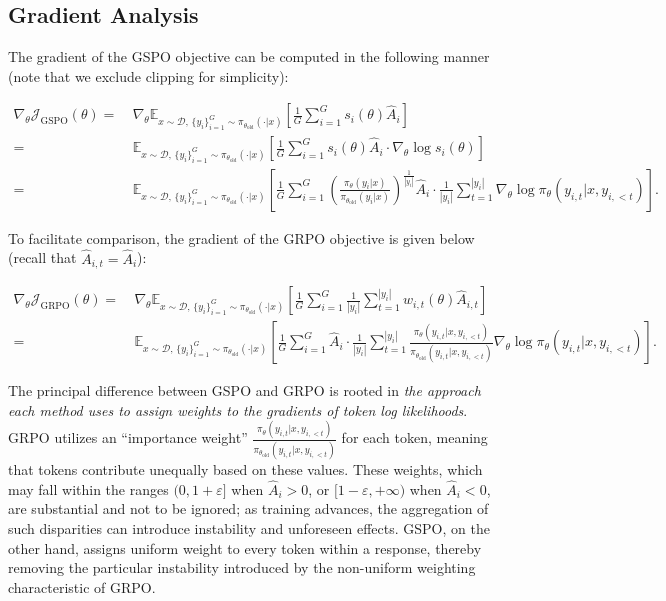 \subsection{Gradient Analysis}
\label{subsec:gradient}

The gradient of the GSPO objective can be computed in the following manner (note that we exclude clipping for simplicity):

\begin{align}
\nabla_{\theta} \mathcal{J}_\text{GSPO} (\theta)
=&\ 
\nabla_{\theta} \mathbb{E}_{ x \sim \mathcal{D},\, \{y_i\}_{i=1}^G \sim \pi_{\theta_\text{old}}( \cdot | x) }
\left[ 
\frac{1}{G} \sum_{i=1}^{G} s_{i}(\theta) \widehat{A}_{i}
\right] \\
= &\ 
\mathbb{E}_{ x \sim \mathcal{D},\, \{y_i\}_{i=1}^G \sim \pi_{\theta_\text{old}}( \cdot | x) }
\left[ 
\frac{1}{G} \sum_{i=1}^{G}
s_{i}(\theta) \widehat{A}_{i}
\cdot \nabla_{\theta} \log s_{i}(\theta)
\right] \\
=&\ 
\mathbb{E}_{ x \sim \mathcal{D},\, \{y_i\}_{i=1}^G \sim \pi_{\theta_\text{old}}( \cdot | x) }
\left[ 
\frac{1}{G} \sum_{i=1}^{G} 
\left( \frac{ \pi_{\theta} (y_i | x) }{ \pi_{\theta_\text{old}} (y_i | x)} \right)^{\frac{1}{|y_i|}} \widehat{A}_{i} 
\cdot \frac{1}{|y_i|} \sum_{t=1}^{|y_i|} \nabla_{\theta} \log \pi_{\theta} (y_{i,t} | x, y_{i,<t}) 
\right].
\label{equ:gspo_grad}
\end{align}

To facilitate comparison, the gradient of the GRPO objective is given below (recall that $\widehat{A}_{i,t} = \widehat{A}_{i}$):

\begin{align}
\nabla_{\theta} \mathcal{J}_\text{GRPO} (\theta) 
=&\ 
\nabla_{\theta} \mathbb{E}_{ x \sim \mathcal{D},\, \{y_i\}_{i=1}^G \sim \pi_{\theta_\text{old}}( \cdot | x) }
\left[ \frac{1}{G} \sum_{i=1}^{G} \frac{1}{|y_i|} \sum_{t=1}^{|y_i|} 
w_{i,t}(\theta) \widehat{A}_{i,t}
\right] \\
=&\
\mathbb{E}_{ x \sim \mathcal{D},\, \{y_i\}_{i=1}^G \sim \pi_{\theta_\text{old}}( \cdot | x) }
\left[ \frac{1}{G} \sum_{i=1}^{G} \widehat{A}_{i} 
\cdot \frac{1}{|y_i|} \sum_{t=1}^{|y_i|} 
\frac{ \pi_{\theta} (y_{i,t} | x, y_{i,<t}) }{ \pi_{\theta_\text{old}} (y_{i,t} | x,y_{i,<t})} 
\nabla_{\theta} \log \pi_{\theta} (y_{i,t} | x, y_{i,<t})  
\right].
\end{align}

The principal difference between GSPO and GRPO is rooted in \textit{the approach each method uses to assign weights to the gradients of token log likelihoods}. GRPO utilizes an ``importance weight'' $\frac{ \pi_{\theta} (y_{i,t} | x, y_{i,<t}) }{ \pi_{\theta_\text{old}} (y_{i,t} | x,y_{i,<t})}$ for each token, meaning that tokens contribute unequally based on these values. These weights, which may fall within the ranges $(0, 1+\varepsilon]$ when $\widehat{A}_{i} >0$, or $[1-\varepsilon, +\infty)$ when $\widehat{A}_{i} < 0$, are substantial and not to be ignored; as training advances, the aggregation of such disparities can introduce instability and unforeseen effects. GSPO, on the other hand, assigns uniform weight to every token within a response, thereby removing the particular instability introduced by the non-uniform weighting characteristic of GRPO.

